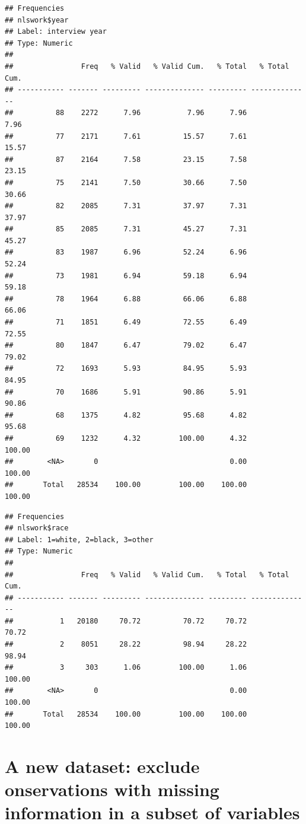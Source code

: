 \documentclass[
]{article}
\begin{document}
\begin{verbatim}
## Frequencies  
## nlswork$year  
## Label: interview year  
## Type: Numeric  
## 
##                Freq   % Valid   % Valid Cum.   % Total   % Total Cum.
## ----------- ------- --------- -------------- --------- --------------
##          88    2272      7.96           7.96      7.96           7.96
##          77    2171      7.61          15.57      7.61          15.57
##          87    2164      7.58          23.15      7.58          23.15
##          75    2141      7.50          30.66      7.50          30.66
##          82    2085      7.31          37.97      7.31          37.97
##          85    2085      7.31          45.27      7.31          45.27
##          83    1987      6.96          52.24      6.96          52.24
##          73    1981      6.94          59.18      6.94          59.18
##          78    1964      6.88          66.06      6.88          66.06
##          71    1851      6.49          72.55      6.49          72.55
##          80    1847      6.47          79.02      6.47          79.02
##          72    1693      5.93          84.95      5.93          84.95
##          70    1686      5.91          90.86      5.91          90.86
##          68    1375      4.82          95.68      4.82          95.68
##          69    1232      4.32         100.00      4.32         100.00
##        <NA>       0                               0.00         100.00
##       Total   28534    100.00         100.00    100.00         100.00
\end{verbatim}

\begin{verbatim}
## Frequencies  
## nlswork$race  
## Label: 1=white, 2=black, 3=other  
## Type: Numeric  
## 
##                Freq   % Valid   % Valid Cum.   % Total   % Total Cum.
## ----------- ------- --------- -------------- --------- --------------
##           1   20180     70.72          70.72     70.72          70.72
##           2    8051     28.22          98.94     28.22          98.94
##           3     303      1.06         100.00      1.06         100.00
##        <NA>       0                               0.00         100.00
##       Total   28534    100.00         100.00    100.00         100.00
\end{verbatim}

\hypertarget{a-new-dataset-exclude-onservations-with-missing-information-in-a-subset-of-variables}{%
\section{A new dataset: exclude onservations with missing information in
a subset of
variables}\label{a-new-dataset-exclude-onservations-with-missing-information-in-a-subset-of-variables}}
\end{document}
